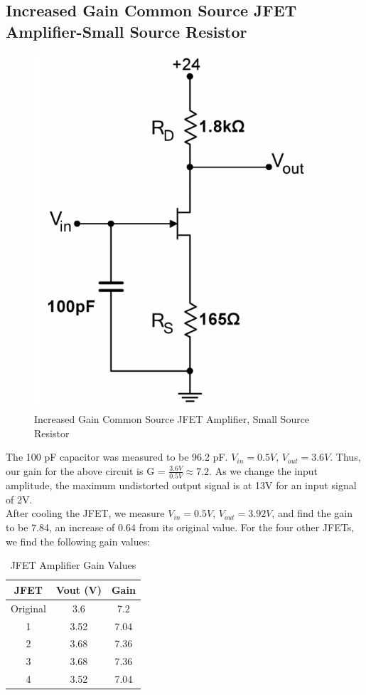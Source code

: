 \documentclass{article}
\begin{document}
\subsection{Increased Gain Common Source JFET Amplifier-Small Source Resistor}
    \begin{figure}[H]
        \centering
        \includegraphics[scale = 0.6]{5_3.png}
        \caption{Increased Gain Common Source JFET Amplifier, Small Source Resistor~\cite{webfig}}
        \label{fig:my_label}
    \end{figure}
    The 100 pF capacitor was measured to be 96.2 pF. $V_{in} = 0.5V$, $V_{out} = 3.6 V$. Thus, our gain for the above circuit is G = $\frac{3.6V}{0.5V} \approx 7.2$. As we change the input amplitude, the maximum undistorted output signal is at 13V for an input signal of 2V. \\\indent After cooling the JFET, we measure $V_{in} = 0.5V$, $V_{out} = 3.92 V$, and find the gain to be 7.84, an increase of 0.64 from its original value. For the four other JFETs, we find the following gain values: 
    \begin{table}[H]
        \centering
        \caption{JFET Amplifier Gain Values}
        \label{my-label}
        \begin{tabular}{ccc}
        \textbf{JFET} & \textbf{Vout (V)} & \textbf{Gain} \\ \hline
        Original & 3.6 & 7.2 \\
        1 & 3.52 & 7.04 \\
        2 & 3.68 & 7.36 \\
        3 & 3.68 & 7.36 \\
        4 & 3.52 & 7.04
        \end{tabular}
    \end{table}
\end{document}
